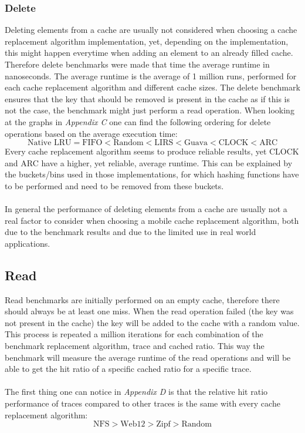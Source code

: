 \documentclass[pdftex,a4paper,12pt,twoside]{report}
\begin{document}
\subsubsection{Delete} Deleting elements from a cache are usually not considered when choosing a cache replacement algorithm implementation, yet, depending on the implementation, this might happen everytime when adding an element to an already filled cache. Therefore delete benchmarks were made that time the average runtime in nanoseconds.
The average runtime is the average of 1 million runs, performed for each cache replacement algorithm and different cache sizes. The delete benchmark ensures that the key that should be removed is present in the cache as if this is not the case, the benchmark might just perform a read operation.
When looking at the graphs in \emph{Appendix C} one can find the following ordering for delete operations based on the average execution time:
\[
\text{Native LRU} = \text{FIFO} < \text{Random} < \text{LIRS} < \text{Guava} < \text{CLOCK} < \text{ARC} 
\]
Every cache replacement algorithm seems to produce reliable results, yet CLOCK and ARC have a higher, yet reliable, average runtime. This can be explained by the buckets/bins used in those implementations, for which hashing functions have to be performed and need to be removed from these buckets.
\\\\
In general the performance of deleting elements from a cache are usually not a real factor to consider when choosing a mobile cache replacement algorithm, both due to the benchmark results and due to the limited use in real world applications.
\subsection{Read}
Read benchmarks are initially performed on an empty cache, therefore there should always be at least one miss. When the read operation failed (the key was not present in the cache) the key will be added to the cache with a random value. This process is repeated a million iterations for each combination of the benchmark replacement algorithm, trace and cached ratio. This way the benchmark will measure the average runtime of the read operations and will be able to get the hit ratio of a specific cached ratio for a specific trace.
\\\\
The first thing one can notice in \emph{Appendix D} is that the relative hit ratio performance of traces compared to other traces is the same with every cache replacement algorithm:
\[
\text{NFS} > \text{Web12} > \text{Zipf} > \text{Random}
\]
\end{document}
